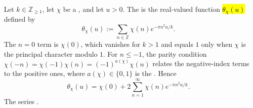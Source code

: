 \begin{definition} \label{definition:theta_function_associated_to_a_dirichlet_character}
Let $k \in \mathbb{Z}_{\geq 1}$, let $\chi$ be a , and let $u > 0$. The  is the real-valued function \hl{$\theta_\chi(u)$} defined by
$$\theta_\chi(u) := \sum_{n \in \mathbb{Z}} \chi(n) e^{-\pi n^2 u / k}.$$
The $n = 0$ term is $\chi(0)$, which vanishes for $k > 1$ and equals $1$ only when $\chi$ is the principal character modulo $1$. For $n \leq -1$, the parity condition $\chi(-n) = \chi(-1)\chi(n) = (-1)^{a(\chi)}\chi(n)$ relates the negative-index terms to the positive ones, where $a(\chi) \in \{0,1\}$ is the . Hence
$$\theta_\chi(u) = \chi(0) + 2 \sum_{n=1}^\infty \chi(n) e^{-\pi n^2 u / k}.$$
The series .
\end{definition}
